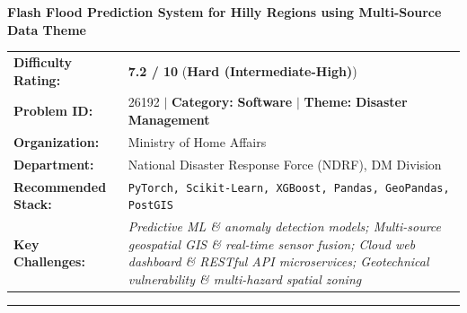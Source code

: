 \documentclass[10pt,a4paper]{article}
\begin{document}
\begin{tcolorbox}[pscard, title={"\textbf{SIH26192} \quad $\vert$ \quad Flash Flood Prediction System for Hilly Regions using Multi-Source Data The...}]
\textbf{\large Flash Flood Prediction System for Hilly Regions using Multi-Source Data Theme}\\[0.25cm]

\begin{tabular}{@{}lp{12.5cm}@{}}
\textbf{Difficulty Rating:} & \textcolor{diffhard}{\textbf{\Large 7.2 / 10}} \quad (\textbf{Hard (Intermediate-High)}) \\
\textbf{Problem ID:} & 26192 \quad $\vert$ \quad \textbf{Category:} \textbf{Software} \quad $\vert$ \quad \textbf{Theme:} \textbf{Disaster Management} \\
\textbf{Organization:} & Ministry of Home Affairs \\
\textbf{Department:} & National Disaster Response Force (NDRF), DM Division \\
\textbf{Recommended Stack:} & \texttt{PyTorch, Scikit-Learn, XGBoost, Pandas, GeoPandas, PostGIS} \\
\textbf{Key Challenges:} & \textit{\small Predictive ML \& anomaly detection models; Multi-source geospatial GIS \& real-time sensor fusion; Cloud web dashboard \& RESTful API microservices; Geotechnical vulnerability \& multi-hazard spatial zoning} \\
\end{tabular}

\vspace{0.2cm}
\hrule
\vspace{0.2cm}


\end{tcolorbox}
\end{document}
